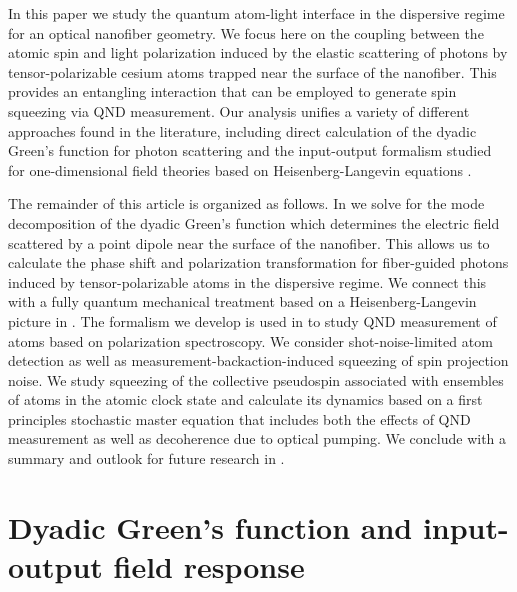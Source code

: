 \documentclass[aps,pra,twocolumn]{revtex4-1} %
\begin{document}
In this paper we study the quantum atom-light interface in the dispersive regime for an optical nanofiber geometry.  We focus here on the coupling between the atomic spin and light polarization induced by the elastic scattering of photons by tensor-polarizable cesium atoms trapped near the surface of the nanofiber.  This provides an entangling interaction that can be employed to generate spin squeezing via QND measurement.  Our analysis unifies a variety of different approaches found in the literature, including direct calculation of the dyadic Green's function for photon scattering \cite{sakoda_optical_1996, dung_spontaneous_2000, sondergaard_general_2001, klimov_spontaneous_2004, wubs_multiple-scattering_2004, fussell_decay_2005, manga_rao_single_2007, dzsotjan_quantum_2010} and the input-output formalism studied for one-dimensional field theories based on Heisenberg-Langevin equations \cite{gardiner_input_1985, blow_continuum_1990, shen_coherent_2005, le_kien_spontaneous_2005, le_kien_correlations_2008, fan_input-output_2010}.

The remainder of this article is organized as follows.  
In  we solve for the mode decomposition of the dyadic Green's function which determines the electric field scattered by a point dipole near the surface of the nanofiber.  
This allows us to calculate the phase shift and polarization transformation for fiber-guided photons induced by tensor-polarizable atoms in the dispersive regime.  
We connect this with a fully quantum mechanical treatment based on a Heisenberg-Langevin picture in .  
The formalism we develop is used in  to study QND measurement of atoms based on polarization spectroscopy. 
We consider shot-noise-limited atom detection as well as measurement-backaction-induced squeezing of spin projection noise.  
We study squeezing of the collective pseudospin associated with ensembles of atoms in the atomic clock state and calculate its dynamics based on a first principles stochastic master equation that includes both the effects of QND measurement as well as decoherence due to optical pumping.  
We conclude with a summary and outlook for future research in .  


\section{Dyadic Green's function and input-output field response} \label{Sec::GreensFunction}
\end{document}
